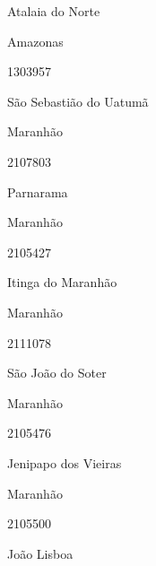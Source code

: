 \documentclass[
  letterpaper,
]{report}
\begin{document}
Atalaia do Norte

\n    

\n    

\n      

Amazonas

\n      

1303957

\n      

São Sebastião do Uatumã

\n    

\n    

\n      

Maranhão

\n      

2107803

\n      

Parnarama

\n    

\n    

\n      

Maranhão

\n      

2105427

\n      

Itinga do Maranhão

\n    

\n    

\n      

Maranhão

\n      

2111078

\n      

São João do Soter

\n    

\n    

\n      

Maranhão

\n      

2105476

\n      

Jenipapo dos Vieiras

\n    

\n    

\n      

Maranhão

\n      

2105500

\n      

João Lisboa

\n    

\n    

\n      
\end{document}
